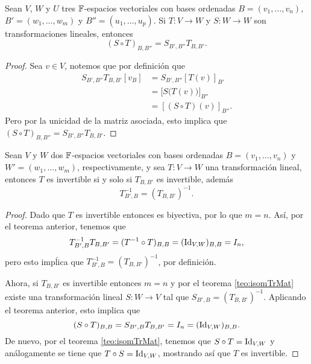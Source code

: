 \begin{teor}
  Sean $V$, $W$ y $U$ tres $\mathbb{F}$-espacios vectoriales con bases ordenadas $B = (v_1,\ldots,v_n)$, $B' = (w_1,\ldots,w_m)$ y $B'' = (u_1,\ldots,u_p)$. Si $T\colon V \to W$ y $S\colon W \to W$ son transformaciones lineales, entonces
  \[ (S \circ T)_{B,B''} = S_{B',B''} T_{B,B'}. \]
\end{teor}
\begin{proof}
  Sea $v \in V$, notemos que por definición que
    \begin{align*}
      S_{B',B''} T_{B,B'}[v_B] &= S_{B',B''}[T(v)]_{B'} \\
        &= \bigl[ S\bigl(T(v)\bigr) \bigr]_{B''} \\
        &= [(S\circ T)(v)]_{B''}.
    \end{align*}
  Pero por la unicidad de la matriz asociada, esto implica que $(S \circ T)_{B,B''} = S_{B',B''} T_{B,B'}$.
\end{proof}

\begin{coro}
  Sean $V$ y $W$ dos $\mathbb{F}$-espacios vectoriales con bases ordenadas $B = (v_1,\ldots,v_n)$ y $W' = (w_1,\ldots,w_m)$, respectivamente, y sea $T\colon V \to W$ una transformación lineal, entonces $T$ es invertible si y solo si $T_{B,B'}$ es invertible, además
    \[ T_{B',B}^{-1} = (T_{B,B'})^{-1}. \]
\end{coro}
\begin{proof}
  Dado que $T$ es invertible entonces es biyectiva, por lo que $m = n$. Así, por el teorema anterior, tenemos que
  \[ T^{-1}_{B',B} T_{B,B'} = (T^{-1}\circ T)_{B,B} = (\mathrm{Id}_{V,W})_{B,B} = I_n, \]
  pero esto impĺica que $T_{B',B}^{-1} = (T_{B,B'})^{-1}$, por definición.

  Ahora, si $T_{B,B'}$ es invertible entonces $m = n$ y por el teorema \ref{teo:isomTrMat} existe una transformación lineal $S\colon W \to V$ tal que $S_{B',B} =  (T_{B,B'})^{-1}$. Aplicando el teorema anterior, esto implica que
    \[ (S \circ T)_{B,B} =  S_{B',B}T_{B,B'} = I_n = (\mathrm{Id}_{V,W})_{B,B}. \]
  De nuevo, por el teorema \ref{teo:isomTrMat}, tenemos que $S \circ T = \mathrm{Id}_{V,W}$ y análogamente se tiene que $T \circ S = \mathrm{Id}_{V,W}$, mostrando así que $T$ es invertible.
\end{proof}

